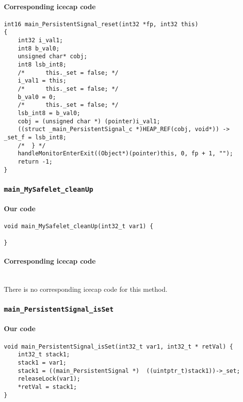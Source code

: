 \begin{landscape}
\begin{multicols}{2}
\paragraph{Corresponding icecap code}\hfill
\begin{lstlisting}[firstnumber=54641]
int16 main_PersistentSignal_reset(int32 *fp, int32 this)
{
	int32 i_val1;
	int8 b_val0;
	unsigned char* cobj;
	int8 lsb_int8;
	/*		this._set = false; */
	i_val1 = this;
	/*		this._set = false; */
	b_val0 = 0;
	/*		this._set = false; */
	lsb_int8 = b_val0;
	cobj = (unsigned char *) (pointer)i_val1;
	((struct _main_PersistentSignal_c *)HEAP_REF(cobj, void*)) -> _set_f = lsb_int8;
	/*	} */
	handleMonitorEnterExit((Object*)(pointer)this, 0, fp + 1, "");
	return -1;
}
\end{lstlisting}

\subsubsection{\texttt{main\_MySafelet\_cleanUp}}

\paragraph{Our code}\hfill
\begin{lstlisting}[firstnumber=646]
void main_MySafelet_cleanUp(int32_t var1) {
	
}
\end{lstlisting}

\paragraph{Corresponding icecap code}\hfill\\
There is no corresponding icecap code for this method.

\subsubsection{\texttt{main\_PersistentSignal\_isSet}}

\paragraph{Our code}\hfill
\begin{lstlisting}[firstnumber=814]
void main_PersistentSignal_isSet(int32_t var1, int32_t * retVal) {
	int32_t stack1;
	stack1 = var1;
	stack1 = ((main_PersistentSignal *)  ((uintptr_t)stack1))->_set;
	releaseLock(var1);
	*retVal = stack1;
}
\end{lstlisting}


\end{multicols}
\end{landscape}
